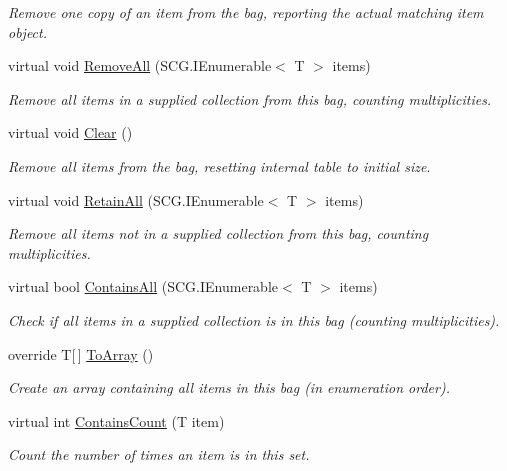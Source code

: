 \begin{DoxyCompactItemize}
\begin{DoxyCompactList}\small\item\em Remove one copy of an item from the bag, reporting the actual matching item object. \end{DoxyCompactList}\item 
virtual void \hyperlink{class_c5_1_1_hash_bag_ab207da94ab560f22eabefaa17fdbd6d7}{Remove\+All} (S\+C\+G.\+I\+Enumerable$<$ T $>$ items)
\begin{DoxyCompactList}\small\item\em Remove all items in a supplied collection from this bag, counting multiplicities. \end{DoxyCompactList}\item 
virtual void \hyperlink{class_c5_1_1_hash_bag_a56b6eaa83ad0f3851cb48322f536f3d8}{Clear} ()
\begin{DoxyCompactList}\small\item\em Remove all items from the bag, resetting internal table to initial size. \end{DoxyCompactList}\item 
virtual void \hyperlink{class_c5_1_1_hash_bag_aa83a436a144bb83ea23059d2b9d54a45}{Retain\+All} (S\+C\+G.\+I\+Enumerable$<$ T $>$ items)
\begin{DoxyCompactList}\small\item\em Remove all items {\itshape not} in a supplied collection from this bag, counting multiplicities. \end{DoxyCompactList}\item 
virtual bool \hyperlink{class_c5_1_1_hash_bag_aff78f22f0c5e6b5dc2c550cd0d5a24e3}{Contains\+All} (S\+C\+G.\+I\+Enumerable$<$ T $>$ items)
\begin{DoxyCompactList}\small\item\em Check if all items in a supplied collection is in this bag (counting multiplicities). \end{DoxyCompactList}\item 
override T\mbox{[}$\,$\mbox{]} \hyperlink{class_c5_1_1_hash_bag_a7be4bcb7a5ef7f9414a33cfb9439e15e}{To\+Array} ()
\begin{DoxyCompactList}\small\item\em Create an array containing all items in this bag (in enumeration order). \end{DoxyCompactList}\item 
virtual int \hyperlink{class_c5_1_1_hash_bag_ae9d24cf11e28837e35dfcf9a89858a90}{Contains\+Count} (T item)
\begin{DoxyCompactList}\small\item\em Count the number of times an item is in this set. \end{DoxyCompactList}\item 

\end{DoxyCompactItemize}
